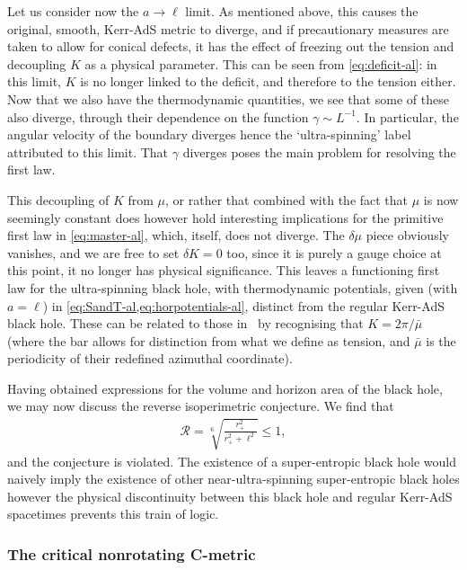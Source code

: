 \documentclass[
twoside,
openright,
frontopenright,
]{dmathesis}
\newcommand{\todoopt}[2][]{\todo[color=blue!20,size=\footnotesize,#1]{#2}}
\begin{document}
Let us consider now the $a\to\ell$ limit. As mentioned above, this causes the
original, smooth, Kerr-AdS metric to diverge, and if precautionary measures are
taken to allow for conical defects, it has the effect of freezing out the
tension and decoupling $K$ as a physical parameter. This can be seen from
\cref{eq:deficit-al}: in this limit, $K$ is no longer linked to the deficit, and
therefore to the tension either. Now that we also have the thermodynamic
quantities, we see that some of these also diverge, through their dependence on
the function $\gamma\sim L^{-1}$. In particular, the angular velocity of the
boundary diverges hence the `ultra-spinning' label attributed to this
limit. That $\gamma$ diverges poses the main problem for resolving the first
law.

This decoupling of $K$ from $\mu$, or rather that combined with the fact that
$\mu$ is now seemingly constant does however hold interesting implications for
the primitive first law in \cref{eq:master-al}, which, itself, does not
diverge. The $\delta \mu$ piece obviously vanishes, and we are free to set
$\delta K=0$ too, since it is purely a gauge choice at this point, it no longer
has physical significance. This leaves a functioning first law for the
ultra-spinning black hole, with thermodynamic potentials, given (with $a=\ell$)
in \cref{eq:SandT-al,eq:horpotentials-al}, distinct from the regular Kerr-AdS
black hole. These can be related to those
in~\cite{Hennigar:2014cfa,Hennigar:2015cja} by recognising that
$K=2\pi/\bar{\mu}$ (where the bar allows for distinction from what we define as
tension, and $\bar{\mu}$ is the periodicity of their redefined azimuthal
coordinate).

Having obtained expressions for the volume and horizon area of the black hole,
we may now discuss the reverse isoperimetric conjecture. We find that
\begin{align} \mathcal{R} =
\sqrt[6~]{\frac{r_{+}^{2}}{r_{+}^{2}+\ell^{2}}}\leqslant 1,
\end{align} and the conjecture is violated. The existence of a super-entropic
black hole would naively imply the existence of other near-ultra-spinning
super-entropic black holes however the physical discontinuity between this black
hole and regular Kerr-AdS spacetimes prevents this train of
logic. \todoopt{Implications for conjecture validity?} 

\subsubsection{The critical nonrotating C-metric}
\label{sec:critnrC}
\end{document}
